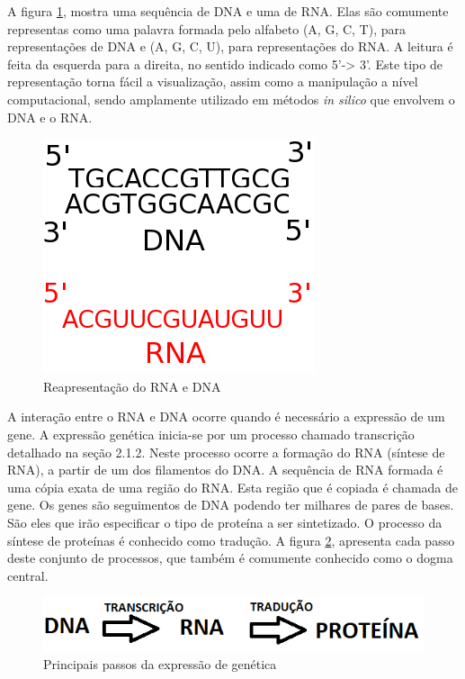 A figura \ref{fig:repre_sequencia}, mostra uma sequência de DNA e uma de RNA. Elas são comumente representas como uma palavra formada pelo alfabeto (A, G, C, T), para representações de DNA e (A, G, C, U), para representações do RNA. A leitura é feita da esquerda para a direita, no sentido indicado como 5'-> 3'. Este tipo de representação torna fácil a visualização, assim como a manipulação a nível computacional, sendo amplamente utilizado em métodos \textit{in silico} que envolvem o DNA e o RNA.

\begin{figure}[htb!]
    \centering
    \includegraphics[scale=0.7]{./imagens/repre_sequencia.png}
    \caption{Reapresentação do RNA e DNA}
    \label{fig:repre_sequencia}
\end{figure}

A interação entre o RNA e DNA ocorre quando é necessário a expressão de um gene. A expressão genética inicia-se por um processo chamado transcrição detalhado na seção 2.1.2. Neste processo ocorre a formação do RNA (síntese de RNA), a partir de um dos filamentos do DNA. A sequência de RNA formada é uma cópia exata de uma região do RNA. Esta região que é copiada é chamada de gene. Os genes são seguimentos de DNA podendo ter milhares de pares de bases. São eles que irão especificar o tipo de proteína a ser sintetizado. O processo da síntese de proteínas é conhecido como tradução. A figura \ref{fig:passo_expresscao_genica}, apresenta cada passo deste conjunto de processos, que também é comumente conhecido como o dogma central.

\begin{figure}[htb!]
    \centering
    \includegraphics[scale=0.7]{./imagens/passo_expresscao_genica.png}
    \caption{Principais passos da expressão de genética}
    \label{fig:passo_expresscao_genica}
\end{figure}


